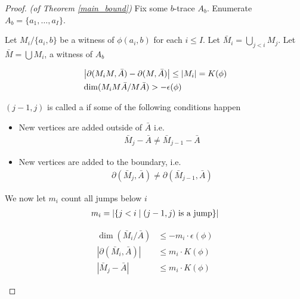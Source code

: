 \begin{proof} \textit{(of Theorem \ref{main_bound})}
  Fix some $b$-trace $A_b$. Enumerate $A_b = \{a_1, \ldots, a_I\}$.

  Let $M_i / \{a_i, b\}$ be a witness of $\phi(a_i, b)$ for each $i \leq I$.
  Let $\bar M_i = \bigcup_{j < i} M_j$.
  Let $\bar M = \bigcup M_i$, a witness of $A_b$
  
  \begin{Claim}
    \begin{align*}
      &\left|\partial(M_i M, \bar A) - \partial(M, \bar A)\right| \leq |M_i| = K(\phi)\\
      &\dim(M_i M \bar A / M \bar A) > -\epsilon(\phi)
    \end{align*}
  \end{Claim}
  
  \begin{Definition}
    $(j-1, j)$ is called a  if some of the following conditions happen
    \begin{itemize}
    \item New vertices are added outside of $\bar A$ i.e.
      \begin{align*}
        \bar M_j - \bar A \neq \bar M_{j-1} - \bar A
      \end{align*}
    \item New vertices are added to the boundary, i.e.
      \begin{align*}
        \partial(\bar M_j, \bar A) \neq \partial(\bar M_{j-1}, \bar A)
      \end{align*}
    \end{itemize}
  \end{Definition}

  \begin{Definition}
    We now let $m_i$ count all jumps below $i$
    \begin{align*}
      m_i = \left|\left\{j < i \mid (j-1, j) \text{ is a jump}\right\}\right|
    \end{align*}
  \end{Definition}

  \begin{Lemma} \label{ub_lemma}
    \begin{align*}
      \dim(\bar M_i / \bar A) &\leq -m_i \cdot \epsilon(\phi) \\
      |\partial(\bar M_i, \bar A)| &\leq m_i \cdot K(\phi) \\
      |\bar M_j - \bar A| &\leq m_i \cdot K(\phi)
    \end{align*}
  \end{Lemma}


\end{proof}
